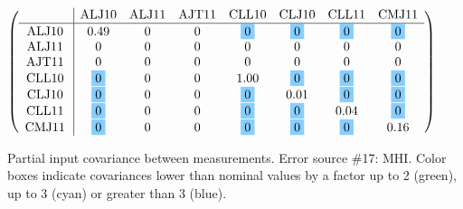\begin{table}[H]
\scriptsize
\begin{center}
\renewcommand{\arraystretch}{1.1}
\begin{math}\left(\begin{array}{c|ccccccc}
 & \mathrm{ALJ10} & 
\mathrm{ALJ11} & 
\mathrm{AJT11} & 
\mathrm{CLL10} & 
\mathrm{CLJ10} & 
\mathrm{CLL11} & 
\mathrm{CMJ11} \\
\hline
\mathrm{ALJ10} \hspace*{2pt} &       0.49 &  0 &  0 &  \colorbox{SkyBlue1}{$ 0$} &  \colorbox{SkyBlue1}{$ 0$} &  \colorbox{SkyBlue1}{$ 0$} &  \colorbox{SkyBlue1}{$ 0$} \\
\mathrm{ALJ11} \hspace*{2pt} &  0 &  0 &  0 &  0 &  0 &  0 &  0 \\
\mathrm{AJT11} \hspace*{2pt} &  0 &  0 &  0 &  0 &  0 &  0 &  0 \\
\mathrm{CLL10} \hspace*{2pt} &  \colorbox{SkyBlue1}{$ 0$} &  0 &  0 &       1.00 &  \colorbox{SkyBlue1}{$ 0$} &  \colorbox{SkyBlue1}{$ 0$} &  \colorbox{SkyBlue1}{$ 0$} \\
\mathrm{CLJ10} \hspace*{2pt} &  \colorbox{SkyBlue1}{$ 0$} &  0 &  0 &  \colorbox{SkyBlue1}{$ 0$} &       0.01 &  \colorbox{SkyBlue1}{$ 0$} &  \colorbox{SkyBlue1}{$ 0$} \\
\mathrm{CLL11} \hspace*{2pt} &  \colorbox{SkyBlue1}{$ 0$} &  0 &  0 &  \colorbox{SkyBlue1}{$ 0$} &  \colorbox{SkyBlue1}{$ 0$} &       0.04 &  \colorbox{SkyBlue1}{$ 0$} \\
\mathrm{CMJ11} \hspace*{2pt} &  \colorbox{SkyBlue1}{$ 0$} &  0 &  0 &  \colorbox{SkyBlue1}{$ 0$} &  \colorbox{SkyBlue1}{$ 0$} &  \colorbox{SkyBlue1}{$ 0$} &       0.16 \\
\end{array}\right)\end{math}
\caption{Partial input covariance between measurements. Error source \#17: MHI. Color boxes indicate covariances lower than nominal values by a factor up to 2 (green), up to 3 (cyan) or greater than 3 (blue).}
\renewcommand{\arraystretch}{1}
\end{center}
\end{table}
